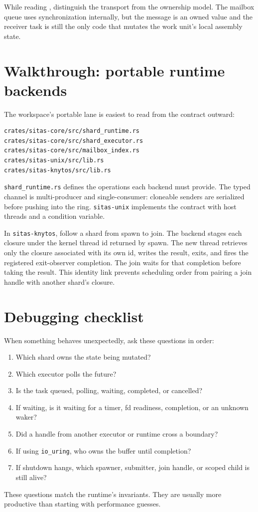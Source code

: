 While reading , distinguish the transport from
the ownership model. The mailbox queue uses synchronization internally, but
the message is an owned value and the receiver task is still the only code that
mutates the work unit's local assembly state.

\section{Walkthrough: portable runtime backends}

The workspace's portable lane is easiest to read from the contract outward:

\begin{lstlisting}[language={},caption={Portable runtime reading path}]
crates/sitas-core/src/shard_runtime.rs
crates/sitas-core/src/shard_executor.rs
crates/sitas-core/src/mailbox_index.rs
crates/sitas-unix/src/lib.rs
crates/sitas-knytos/src/lib.rs
\end{lstlisting}

\texttt{shard\_runtime.rs} defines the operations each backend must provide.
The typed channel is multi-producer and single-consumer: cloneable senders are
serialized before pushing into the ring. \texttt{sitas-unix} implements the
contract with host threads and a condition variable.

In \texttt{sitas-knytos}, follow a shard from spawn to join. The backend
stages each closure under the kernel thread id returned by spawn. The new
thread retrieves only the closure associated with its own id, writes the
result, exits, and fires the registered exit-observer completion. The join
waits for that completion before taking the result. This identity link prevents
scheduling order from pairing a join handle with another shard's closure.

\section{Debugging checklist}
\label{sec:debugging-checklist}

When something behaves unexpectedly, ask these questions in order:

\begin{enumerate}
    \item Which shard owns the state being mutated?
    \item Which executor polls the future?
    \item Is the task queued, polling, waiting, completed, or cancelled?
    \item If waiting, is it waiting for a timer, fd readiness, completion, or
          an unknown waker?
    \item Did a handle from another executor or runtime cross a boundary?
    \item If using \texttt{io\_uring}, who owns the buffer until completion?
    \item If shutdown hangs, which spawner, submitter, join handle, or scoped
          child is still alive?
\end{enumerate}

These questions match the runtime's invariants. They are usually more
productive than starting with performance guesses.

